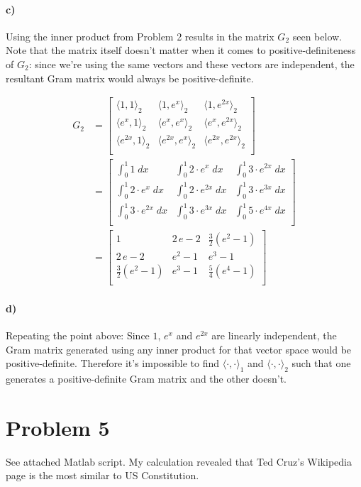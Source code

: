 \documentclass[10pt,letter]{article}
\newcommand{\inner}{\langle\cdot,\cdot\rangle}
\newcommand{\inr}[2]{\langle #1, #2\rangle}
\begin{document}
\paragraph{c)} Using the inner product from Problem 2 results in the matrix $G_2$ seen below. Note that the matrix itself doesn't matter when it comes to positive-definiteness of $G_2$: since we're using the same vectors and these vectors are independent, the resultant Gram matrix would always be positive-definite.

\begin{align*}
G_2 &=
\left[ {\begin{array}{ccccc}
 \inr{1}{1}_2 & \inr{1}{e^x}_2 & \inr{1}{e^{2x}}_2  \\
 \inr{e^x}{1}_2 & \inr{e^x}{e^x}_2 & \inr{e^x}{e^{2x}}_2  \\
 \inr{e^{2x}}{1}_2 & \inr{e^{2x}}{e^x}_2 & \inr{e^{2x}}{e^{2x}}_2  \\
\end{array} } \right]
\\ &=
\left[ {\begin{array}{ccccc}
 \int^1_0 1\; dx             & \int^1_0 2\cdot e^x\; dx    & \int^1_0 3\cdot e^{2x}\; dx  \\
 \int^1_0 2\cdot e^x\; dx    & \int^1_0 2\cdot e^{2x}\; dx & \int^1_0 3\cdot e^{3x}\; dx  \\
 \int^1_0 3\cdot e^{2x}\; dx & \int^1_0 3\cdot e^{3x}\; dx & \int^1_0 5\cdot e^{4x}\; dx  \\
\end{array} } \right]
\\ &=
\left[ {\begin{array}{ccccc}
 1     &  2\,e - 2 & \frac{3}{2}(e^2 - 1) \\
 2\,e - 2 & e^2 - 1 & e^3 - 1  \\
 \frac{3}{2}(e^2 - 1) & e^3 - 1 & \frac{5}{4}(e^4 - 1)  \\
\end{array} } \right]
\end{align*}

\paragraph{d)} Repeating the point above: Since $1$, $e^x$ and $e^{2x}$ are linearly independent, the Gram matrix generated using any inner product for that vector space would be positive-definite. Therefore it's impossible to find $\inner_1$ and $\inner_2$ such that one generates a positive-definite Gram matrix and the other doesn't.

\section*{Problem 5}

See attached Matlab script. My calculation revealed that Ted Cruz's Wikipedia page is the most similar to US Constitution.
\end{document}
